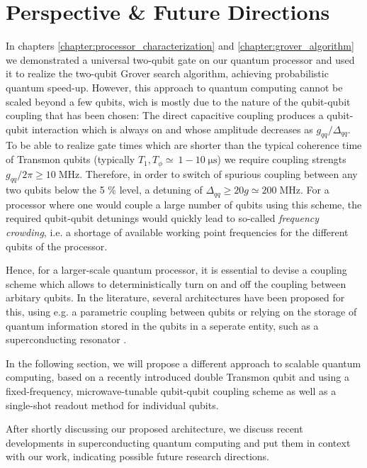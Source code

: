 \chapter{Perspective \& Future Directions}

In chapters \ref{chapter:processor_characterization} and \ref{chapter:grover_algorithm} we demonstrated a universal two-qubit gate on our quantum processor and used it to realize the two-qubit Grover search algorithm, achieving probabilistic quantum speed-up. However, this approach to quantum computing cannot be scaled beyond a few qubits, wich is mostly due to the nature of the qubit-qubit coupling that has been chosen: The direct capacitive coupling produces a qubit-qubit interaction which is always on and whose amplitude decreases as $g_{qq}/\Delta_{qq}$. To be able to realize gate times which are shorter than the typical coherence time of Transmon qubits (typically $T_1,T_\phi \simeq\ 1-10 \;\mathrm{\mu s}$) we require coupling strengts $g_{qq}/2\pi \ge 10\;\mathrm{MHz}$. Therefore, in order to switch of spurious coupling between any two qubits below the 5 \% level, a detuning of $\Delta_{qq}\ge 20g \simeq 200\;\mathrm{MHz}$. For a processor where one would couple a large number of qubits using this scheme, the required qubit-qubit detunings would quickly lead to so-called {\it frequency crowding}, i.e. a shortage of available working point frequencies for the different qubits of the processor.

\smallskip

Hence, for a larger-scale quantum processor, it is essential to devise a coupling scheme which allows to deterministically turn on and off the coupling between arbitary qubits. In the literature, several architectures have been proposed for this, using e.g. a parametric coupling between qubits \citep{bertet_parametric_2006} or relying on the storage of quantum information stored in the qubits in a seperate entity, such as a superconducting resonator \citep{galiautdinov_resonatorzero-qubit_2012,mariantoni_implementing_2011}.

\smallskip

In the following section, we will propose a different approach to scalable quantum computing, based on a recently introduced double Transmon qubit \citep{srinivasan_tunable_2011} and using a fixed-frequency, microwave-tunable qubit-qubit coupling scheme as well as a single-shot readout method for individual qubits.

\smallskip

After shortly discussing our proposed architecture, we discuss recent developments in superconducting quantum computing and put them in context with our work, indicating possible future research directions.

